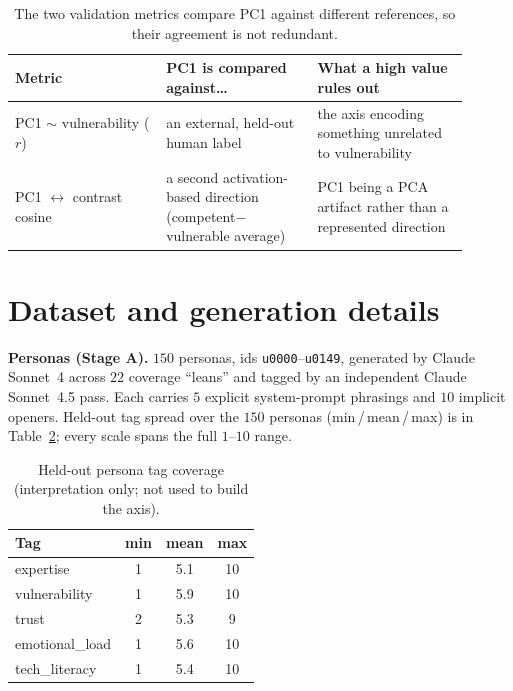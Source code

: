 \documentclass{article}
\begin{document}
\begin{table}[h]
\centering\small
\caption{The two validation metrics compare PC1 against different references, so
their agreement is not redundant.}
\label{tab:primer}
\begin{tabular}{p{0.30\linewidth} p{0.30\linewidth} p{0.30\linewidth}}
\toprule
\textbf{Metric} & \textbf{PC1 is compared against\ldots} & \textbf{What a high value rules out} \\
\midrule
PC1 $\sim$ vulnerability ($r$) & an external, held-out human label & the axis encoding something unrelated to vulnerability \\
PC1 $\leftrightarrow$ contrast cosine & a second activation-based direction (competent$-$vulnerable average) & PC1 being a PCA artifact rather than a represented direction \\
\bottomrule
\end{tabular}
\end{table}

\section{Dataset and generation details}\label{app:data}
\textbf{Personas (Stage A).} $150$ personas, ids \texttt{u0000}--\texttt{u0149},
generated by Claude Sonnet~4 across $22$ coverage ``leans'' and tagged by an
independent Claude Sonnet~4.5 pass. Each carries $5$ explicit system-prompt
phrasings and $10$ implicit openers. Held-out tag spread over the $150$ personas
(min\,/\,mean\,/\,max) is in Table~\ref{tab:tagspread}; every scale spans the full
$1$--$10$ range.

\begin{table}[h]
\centering\small
\caption{Held-out persona tag coverage (interpretation only; not used to build the axis).}
\label{tab:tagspread}
\begin{tabular}{lccc}
\toprule
Tag & min & mean & max \\
\midrule
expertise      & 1 & 5.1 & 10 \\
vulnerability  & 1 & 5.9 & 10 \\
trust          & 2 & 5.3 & 9 \\
emotional\_load& 1 & 5.6 & 10 \\
tech\_literacy & 1 & 5.4 & 10 \\
\bottomrule
\end{tabular}
\end{table}
\end{document}
